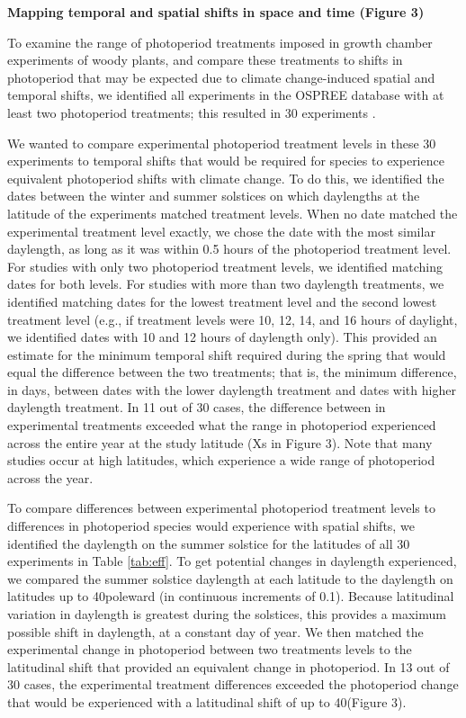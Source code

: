 \documentclass{article}
\begin{document}
\par \textbf{Mapping temporal and spatial shifts in space and time (Figure 3)}
\par To examine the range of photoperiod treatments imposed in growth chamber experiments of woody plants, and compare these treatments to shifts in photoperiod that may be expected due to climate change-induced spatial and temporal shifts, we identified all experiments in the OSPREE database with at least two photoperiod treatments; this resulted in 30 experiments \citep[Table \ref{tab:eff},][]{wolkovich2019}. 
\par We wanted to compare experimental photoperiod treatment levels in these 30 experiments to temporal shifts that would be required for species to experience equivalent photoperiod shifts with climate change. To do this, we identified the dates between the winter and summer solstices on which daylengths at the latitude of the experiments matched treatment levels. When no date matched the experimental treatment level exactly, we chose the date with the most similar daylength, as long as it was within 0.5 hours of the photoperiod treatment level. For studies with only two photoperiod treatment levels, we identified matching dates for both levels. For studies with more than two daylength treatments, we identified matching dates for the lowest treatment level and the second lowest treatment level (e.g., if treatment levels were 10, 12, 14, and 16 hours of daylight, we identified dates with 10 and 12 hours of daylength only). This provided an estimate for the minimum temporal shift required during the spring that would equal the difference between the two treatments; that is, the minimum difference, in days, between dates with the lower daylength treatment and dates with higher daylength treatment.
In 11 out of 30 cases, the difference between in experimental treatments exceeded what the range in photoperiod experienced across the entire year at the study latitude (Xs in Figure 3). Note that many studies occur at high latitudes, which experience a wide range of photoperiod across the year. 

\par To compare differences between experimental photoperiod treatment levels to differences in photoperiod species would experience with spatial shifts, we identified the daylength on the summer solstice for the latitudes of all 30 experiments in Table \ref{tab:eff}. To get potential changes in daylength experienced, we compared the summer solstice daylength at each latitude to the daylength on latitudes up to 40\degree poleward (in continuous increments of 0.1\degree). Because latitudinal variation in daylength is greatest during the solstices, this provides a maximum possible shift in daylength, at a constant day of year. We then matched the experimental change in photoperiod between two treatments levels to the latitudinal shift that provided an equivalent change in photoperiod. In 13 out of 30 cases, the experimental treatment differences exceeded the photoperiod change that would be experienced with a latitudinal shift of up to 40\degree  (Figure 3). 
\end{document}
